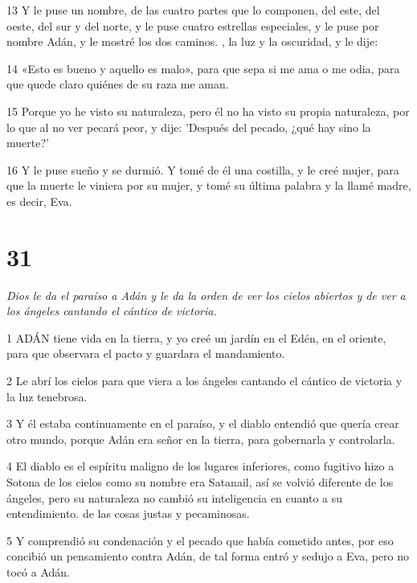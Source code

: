 \par 13 Y le puse un nombre, de las cuatro partes que lo componen, del este, del oeste, del sur y del norte, y le puse cuatro estrellas especiales, y le puse por nombre Adán, y le mostré los dos caminos. , la luz y la oscuridad, y le dije:

\par 14 «Esto es bueno y aquello es malo», para que sepa si me ama o me odia, para que quede claro quiénes de su raza me aman.

\par 15 Porque yo he visto su naturaleza, pero él no ha visto su propia naturaleza, por lo que al no ver pecará peor, y dije: 'Después del pecado, ¿qué hay sino la muerte?'

\par 16 Y le puse sueño y se durmió. Y tomé de él una costilla, y le creé mujer, para que la muerte le viniera por su mujer, y tomé su última palabra y la llamé madre, es decir, Eva.

\chapter{31}

\par \textit{Dios le da el paraíso a Adán y le da la orden de ver los cielos abiertos y de ver a los ángeles cantando el cántico de victoria.}

\par 1 ADÁN tiene vida en la tierra, y yo creé un jardín en el Edén, en el oriente, para que observara el pacto y guardara el mandamiento.

\par 2 Le abrí los cielos para que viera a los ángeles cantando el cántico de victoria y la luz tenebrosa.

\par 3 Y él estaba continuamente en el paraíso, y el diablo entendió que quería crear otro mundo, porque Adán era señor en la tierra, para gobernarla y controlarla.

\par 4 El diablo es el espíritu maligno de los lugares inferiores, como fugitivo hizo a Sotona de los cielos como su nombre era Satanail, así se volvió diferente de los ángeles, pero su naturaleza no cambió su inteligencia en cuanto a su entendimiento. de las cosas justas y pecaminosas.

\par 5 Y comprendió su condenación y el pecado que había cometido antes, por eso concibió un pensamiento contra Adán, de tal forma entró y sedujo a Eva, pero no tocó a Adán.

